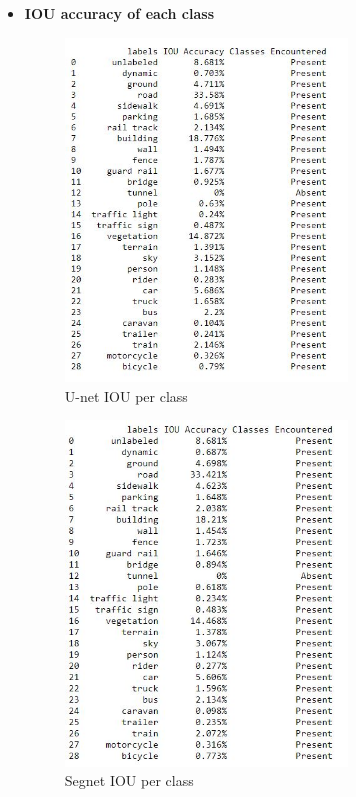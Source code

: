\documentclass{IEEEtran}
\begin{document}
 \setcounter{page}{11}
 \begin{itemize}
 \item  \textbf{IOU accuracy of each class}
\begin{figure}[h]
    \centering
    \captionsetup{justification=centering}
    \includegraphics[width=7.5cm]{U-net-cityscrapes-B16-IOU-C29.JPG}
    \caption{U-net IOU per class}
    \label{fig:Binary class segmented output}
\end{figure}

\begin{figure}[h]
    \centering
    \captionsetup{justification=centering}
    \includegraphics[width=7.5cm]{Segnet-cityscrapes-B16-IOU-C29.JPG}
    \caption{Segnet IOU per class}
    \label{fig:Binary class segmented output}
\end{figure}


\end{itemize}
\end{document}
